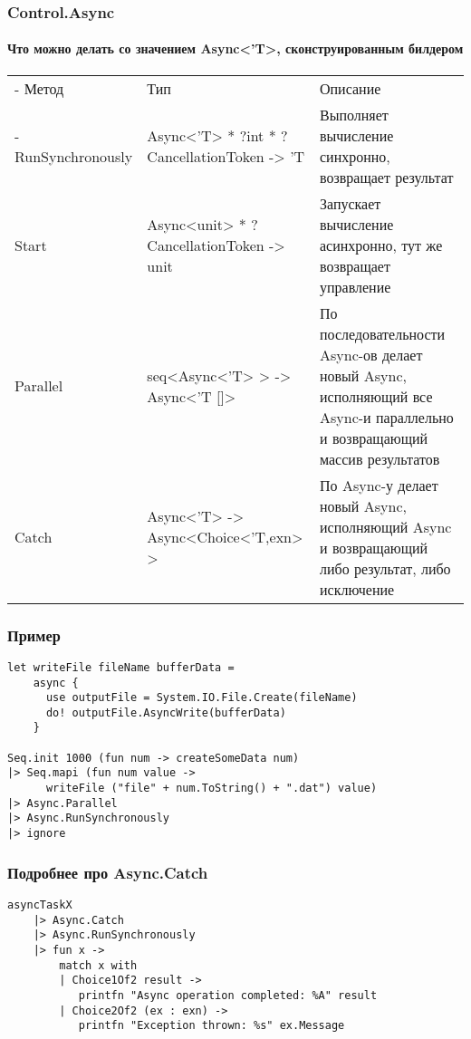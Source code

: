 \documentclass[xetex,mathserif,serif]{beamer}
\begin{document}
	\begin{frame}
		\frametitle{Control.Async}
		\framesubtitle{Что можно делать со значением Async<'T>, сконструированным билдером}
		\begin{footnotesize}
			\begin{tabu} {| X[0.7 l p] | X[1 l p] | X[1 l p] |}
				\tabucline-
				Метод              & Тип                                         & Описание           \\
				\tabucline-
				\everyrow{\tabucline-}
				RunSynchronously   & Async<'T> * ?int * ?CancellationToken -> 'T & Выполняет вычисление синхронно, возвращает результат \\
				Start              & Async<unit> * ?CancellationToken -> unit    & Запускает вычисление асинхронно, тут же возвращает управление \\
				Parallel           & seq<Async<'T> > -> Async<'T []>             & По последовательности Async-ов делает новый Async, исполняющий все Async-и параллельно и возвращающий массив результатов \\
				Catch              & Async<'T> -> Async<Choice<'T,exn> >         & По Async-у делает новый Async, исполняющий Async и возвращающий либо результат, либо исключение \\
			\end{tabu}
		\end{footnotesize}
	\end{frame}

	\begin{frame}[fragile]
		\frametitle{Пример}
		\begin{verbatim}
let writeFile fileName bufferData =
    async {
      use outputFile = System.IO.File.Create(fileName)
      do! outputFile.AsyncWrite(bufferData) 
    }

Seq.init 1000 (fun num -> createSomeData num)
|> Seq.mapi (fun num value -> 
      writeFile ("file" + num.ToString() + ".dat") value)
|> Async.Parallel
|> Async.RunSynchronously
|> ignore
		\end{verbatim}
	\end{frame}

	\begin{frame}[fragile]
		\frametitle{Подробнее про Async.Catch}
		\begin{verbatim}
asyncTaskX
    |> Async.Catch
    |> Async.RunSynchronously
    |> fun x ->
        match x with
        | Choice1Of2 result -> 
           printfn "Async operation completed: %A" result
        | Choice2Of2 (ex : exn) -> 
           printfn "Exception thrown: %s" ex.Message
		\end{verbatim}
	\end{frame}
	
\end{document}
